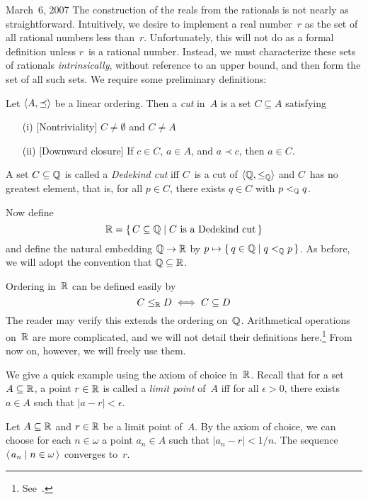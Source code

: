 \begin{lecture}{March~6, 2007}
The construction of the reals from the rationals is not nearly as straightforward. Intuitively, we desire to implement a real number~\(r\) as the set of all rational numbers less than~\(r\). Unfortunately, this will not do as a formal definition unless \(r\)~is a rational number. Instead, we must characterize these sets of rationals \emph{intrinsically}, without reference to an upper bound, and then form the set of all such sets. We require some preliminary definitions:
\begin{defn}
Let \(\langle{A},{\preceq}\rangle\) be a linear ordering. Then a \emph{cut} in~\(A\) is a set \(C\subseteq A\) satisfying
\begin{enumerate}[itemsep=0pt]
\item[(i)] [Nontriviality] \(C\ne\emptyset\) and \(C\ne A\)
\item[(ii)] [Downward closure] If \(c\in C\), \(a\in A\), and \(a\prec c\), then \(a\in C\).
\end{enumerate}
\end{defn}
\begin{defn}
A set \(C\subseteq\mathbb{Q}\) is called a \emph{Dedekind cut} iff \(C\)~is a cut of \(\langle{\mathbb{Q}},{\le_{\mathbb{Q}}}\rangle\) and \(C\)~has no greatest element, that is, for all \(p\in C\), there exists \(q\in C\) with \(p<_{\mathbb{Q}} q\).
\end{defn}
\noindent Now define
\[\mathbb{R}=\{\,C\subseteq\mathbb{Q}\mid C\text{ is a Dedekind cut}\,\}\]
and define the natural embedding \(\mathbb{Q}\to\mathbb{R}\) by \(p\mapsto\{\,q\in\mathbb{Q}\mid q<_{\mathbb{Q}} p\,\}\). As before, we will adopt the convention that \(\mathbb{Q}\subseteq\mathbb{R}\).

Ordering in~\(\mathbb{R}\) can be defined easily by
\[C\le_{\mathbb{R}} D\iff C\subseteq D\]
The reader may verify this extends the ordering on~\(\mathbb{Q}\). Arithmetical operations on~\(\mathbb{R}\) are more complicated, and we will not detail their definitions here.\footnote{See~\cite{enderton77}.} From now on, however, we will freely use them.
\begin{example}
We give a quick example using the axiom of choice in~\(\mathbb{R}\). Recall that for a set \(A\subseteq\mathbb{R}\), a point \(r\in\mathbb{R}\) is called a \emph{limit point} of~\(A\) iff for all \(\epsilon>0\), there exists \(a\in A\) such that \(|a-r|<\epsilon\).

Let \(A\subseteq\mathbb{R}\) and \(r\in\mathbb{R}\) be a limit point of~\(A\). By the axiom of choice, we can choose for each \(n\in\omega\) a point \(a_n\in A\) such that \(|a_n-r|<1/n\). The sequence \(\langle\,{a_n}\mid{n\in\omega}\,\rangle\) converges to~\(r\).
\end{example}
\end{lecture}

